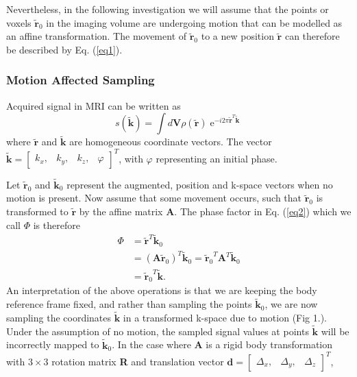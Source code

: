 \documentclass[class=article, crop=false]{standalone}
\begin{document}
\par
Nevertheless, in the following investigation we will assume that the points or voxels $\tilde{\textbf{r}}_0$ in the imaging volume are undergoing motion that can be modelled as an affine transformation. The movement of $\tilde{\textbf{r}}_0$ to a new position $\tilde{\textbf{r}}$ can therefore be described by Eq. (\ref{eq1}).

\subsubsection{Motion Affected Sampling} \label{Section212}

Acquired signal in MRI can be written as
\begin{equation}
	\label{eq2}
	s(\tilde{\textbf{k}}) = \int d\textbf{V} \rho\left(\tilde{\textbf{r}}\right)\operatorname{e}^{-i2\pi\tilde{\textbf{r}}^{T}\tilde{\textbf{k}}}
\end{equation}
where $\tilde{\textbf{r}}$ and $\tilde{\textbf{k}}$ are homogeneous coordinate vectors. The vector $\tilde{\textbf{k}} = \begin{bmatrix}k_{x},&k_{y},&k_{z},&\varphi\end{bmatrix}^{T}$, with $\varphi$ representing an initial phase.
\par
Let $\tilde{\textbf{r}}_0$ and $\tilde{\textbf{k}}_0$ represent the augmented, position and k-space vectors when no motion is present. Now assume that some movement occurs, such that $\tilde{\textbf{r}}_0$ is transformed to $\tilde{\textbf{r}}$ by the affine matrix \textbf{A}. The phase factor in Eq. (\ref{eq2}) which we call $\Phi$ is therefore
\begin{equation} \label{eq3}
	\begin{split}
		\Phi & = \tilde{\textbf{r}}^T\tilde{\textbf{k}}_0 \\ 
			 & = (\textbf{A}\tilde{\textbf{r}}_0)^T\tilde{\textbf{k}}_0
		     = {\tilde{\textbf{r}}_0}^T\textbf{A}^T\tilde{\textbf{k}}_0 \\
		     & = {\tilde{\textbf{r}}_0}^T\tilde{\textbf{k}}.
	\end{split}
\end{equation}
An interpretation of the above operations is that we are keeping the body reference frame fixed, and rather than sampling the points $\tilde{\textbf{k}}_0$, we are now sampling the coordinates $\tilde{\textbf{k}}$ in a transformed k-space due to motion (Fig 1.). Under the assumption of no motion, the sampled signal values at points $\tilde{\textbf{k}}$ will be incorrectly mapped to $\tilde{\textbf{k}}_0$.  In the case where \textbf{A} is a rigid body transformation with $3\times3$ rotation matrix \textbf{R} and translation vector $\textbf{d} = \begin{bmatrix}\Delta_x,&\Delta_y,&\Delta_z\end{bmatrix}^T$,
\end{document}
